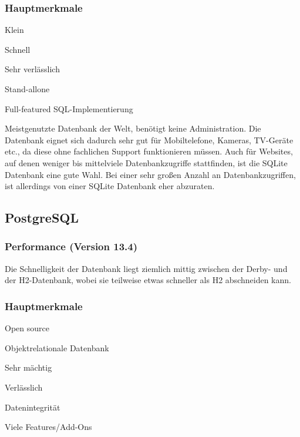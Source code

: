 \subsubsection{Hauptmerkmale}
 
\begin{compactitem}
    \item Klein
    \item Schnell        
    \item Sehr verlässlich
    \item Stand-allone
    \item Full-featured SQL-Implementierung
\end{compactitem} 
\cite{sqlliteOfficialSite}
 
Meistgenutzte Datenbank der Welt, benötigt keine Administration. Die Datenbank eignet sich dadurch sehr gut für Mobiltelefone, Kameras, TV-Geräte etc., da diese ohne fachlichen Support funktionieren müssen. Auch für Websites, auf denen weniger bis mittelviele Datenbankzugriffe stattfinden, ist die SQLite Datenbank eine gute Wahl. Bei einer sehr großen Anzahl an Datenbankzugriffen, ist allerdings von einer SQLite Datenbank eher abzuraten. \cite{databaseComparison}

\subsection{PostgreSQL}
\subsubsection{Performance (Version 13.4)}
Die Schnelligkeit der Datenbank liegt ziemlich mittig zwischen der Derby- und der H2-Datenbank, wobei sie teilweise etwas schneller als H2 abschneiden kann. \cite{databaseComparison}

\subsubsection{Hauptmerkmale}
 
\begin{compactitem}
    \item Open source
    \item Objektrelationale Datenbank        
    \item Sehr mächtig
    \item Verlässlich
    \item Datenintegrität
    \item Viele Features/Add-Ons
\end{compactitem}
\cite{PostgreSQLOfficialSite}
 
